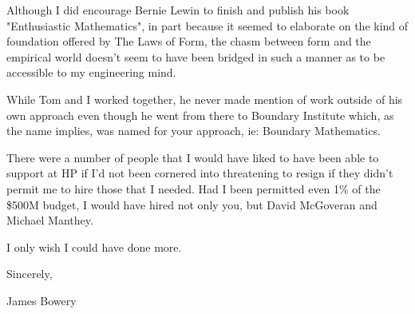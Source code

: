 \documentclass{ws-rv9x6}
\theoremstyle{remark}
\begin{document}
\begin{appendices}
Although I did encourage Bernie Lewin to finish and publish his book "Enthusiastic Mathematics", in part because it seemed to elaborate on the kind of foundation offered by The Laws of Form, the chasm between form and the empirical world doesn't seem to have been bridged in such a manner as to be accessible to my engineering mind.

While Tom and I worked together, he never made mention of work outside of his own approach even though he went from there to Boundary Institute which, as the name implies, was named for your approach, ie: Boundary Mathematics.

There were a number of people that I would have liked to have been able to support at HP if I'd not been cornered into threatening to resign if they didn't permit me to hire those that I needed.  Had I been permitted even 1\% of the \$500M budget, I would have hired not only you, but David McGoveran and Michael Manthey.

I only wish I could have done more.

Sincerely,

James Bowery

\end{appendices}
\end{document}
